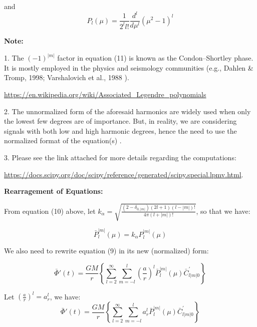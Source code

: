 \documentclass{article}
\begin{document}
and 
\begin{equation}
    P_{l}(\mu) = \frac{1}{2^{l}l!} \frac{d^{l}}{d\mu^{l}}(\mu^{2} - 1)^{l}
\end{equation}



\textbf{Note:} 

1. The $(-1)^{|m|}$ factor in equation (11) is known as the Condon–Shortley phase. It is mostly employed in the physics and seismology communities (e.g., Dahlen & Tromp, 1998; Varshalovich et al., 1988 \cite{https://doi.org/10.1029/2018GC007529}). 

\href{https://en.wikipedia.org/wiki/Associated_Legendre_polynomials}{https://en.wikipedia.org/wiki/Associated_Legendre_polynomials}

2. The unnormalized form of the aforesaid harmonics are widely used when only the lowest few degrees are of importance. But, in reality, we are considering signals with both low and high harmonic degrees, hence the need to use the normalized format of the equation(s) \cite{https://doi.org/10.1029/2018GC007529}. 

3. Please see the link attached for more details regarding the computations: 

\href{https://docs.scipy.org/doc/scipy/reference/generated/scipy.special.lpmv.html}{https://docs.scipy.org/doc/scipy/reference/generated/scipy.special.lpmv.html}.

\vspace{3}

\textbf{Rearragement of Equations:}

\vspace{3}

From equation (10) above, let $k_{\alpha} = \sqrt{\frac{{(2-\delta_{0,|m|})(2l+1)(l-|m|)!}}{{4\pi (l+|m|)!}}}$, so that we have: 

\begin{equation}
    \bar{P}_{l}^{|m|} (\mu) = k_{\alpha} P^{|m|}_{l} (\mu)
\end{equation}

We also need to rewrite equation (9) in its new (normalized) form: 

\begin{equation}
\bar{\Phi}{'}(t) = \frac{GM}{r}\left\{\sum_{l=2}^{\infty}\sum_{m=-l}^{l}\left(\frac{a}{r}\right)^{l}\bar{P}_{l}^{|m|}(\mu)\bar{C}_{l|m|0}^{'}\right\}
\end{equation}

Let $(\frac{a}{r})^{l} = a_{r}^{l}$, we have: 
\begin{equation}
\bar{\Phi}{'}(t) = \frac{GM}{r}\left\{\sum_{l=2}^{\infty}\sum_{m=-l}^{l}a_{r}^{l}\bar{P}_{l}^{|m|}(\mu)\bar{C}_{l|m|0}^{'}\right\}
\end{equation}
\end{document}
